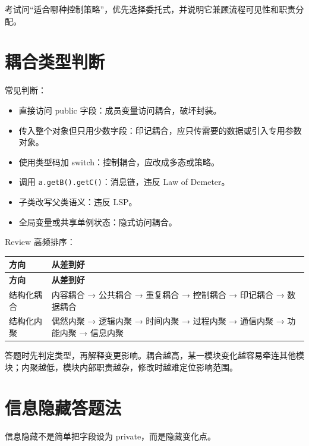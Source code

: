 \documentclass[UTF8,zihao=-4]{ctexart}
\begin{document}
考试问“适合哪种控制策略”，优先选择委托式，并说明它兼顾流程可见性和职责分配。

\section{耦合类型判断}

常见判断：

\begin{itemize}
\item 直接访问 public 字段：成员变量访问耦合，破坏封装。
\item 传入整个对象但只用少数字段：印记耦合，应只传需要的数据或引入专用参数对象。
\item 使用类型码加 switch：控制耦合，应改成多态或策略。
\item 调用 \texttt{a.getB().getC()}：消息链，违反 Law of Demeter。
\item 子类改写父类语义：违反 LSP。
\item 全局变量或共享单例状态：隐式访问耦合。
\end{itemize}

Review 高频排序：

{
\footnotesize
\begin{longtable}{|>{\raggedright\arraybackslash}p{}|>{\raggedright\arraybackslash}p{}|}
\hline
\textbf{方向} & \textbf{从差到好} \\
\hline
\endfirsthead
\hline
\textbf{方向} & \textbf{从差到好} \\
\hline
\endhead
结构化耦合 & 内容耦合 → 公共耦合 → 重复耦合 → 控制耦合 → 印记耦合 → 数据耦合 \\
\hline
结构化内聚 & 偶然内聚 → 逻辑内聚 → 时间内聚 → 过程内聚 → 通信内聚 → 功能内聚 → 信息内聚 \\
\hline
\end{longtable}
}


答题时先判定类型，再解释变更影响。耦合越高，某一模块变化越容易牵连其他模块；内聚越低，模块内部职责越杂，修改时越难定位影响范围。

\section{信息隐藏答题法}

信息隐藏不是简单把字段设为 private，而是隐藏变化点。
\end{document}
